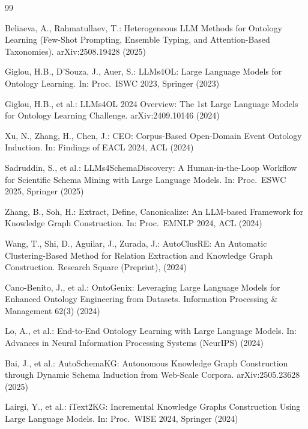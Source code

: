 \documentclass[runningheads,a4paper]{llncs}
\begin{document}

\begin{thebibliography}{99}

Beliaeva, A., Rahmatullaev, T.:
Heterogeneous LLM Methods for Ontology Learning (Few-Shot Prompting,
Ensemble Typing, and Attention-Based Taxonomies).
arXiv:2508.19428 (2025)

Giglou, H.B., D'Souza, J., Auer, S.:
LLMs4OL: Large Language Models for Ontology Learning.
In: Proc.\ ISWC 2023, Springer (2023)

Giglou, H.B., et al.:
LLMs4OL 2024 Overview: The 1st Large Language Models for Ontology
Learning Challenge.
arXiv:2409.10146 (2024)

Xu, N., Zhang, H., Chen, J.:
CEO: Corpus-Based Open-Domain Event Ontology Induction.
In: Findings of EACL 2024, ACL (2024)

Sadruddin, S., et al.:
LLMs4SchemaDiscovery: A Human-in-the-Loop Workflow for Scientific Schema
Mining with Large Language Models.
In: Proc.\ ESWC 2025, Springer (2025)

Zhang, B., Soh, H.:
Extract, Define, Canonicalize: An LLM-based Framework for Knowledge
Graph Construction.
In: Proc.\ EMNLP 2024, ACL (2024)

Wang, T., Shi, D., Aguilar, J., Zurada, J.:
AutoClusRE: An Automatic Clustering-Based Method for Relation Extraction
and Knowledge Graph Construction.
Research Square (Preprint),  (2024)

Cano-Benito, J., et al.:
OntoGenix: Leveraging Large Language Models for Enhanced Ontology
Engineering from Datasets.
Information Processing \& Management 62(3) (2024)

Lo, A., et al.:
End-to-End Ontology Learning with Large Language Models.
In: Advances in Neural Information Processing Systems (NeurIPS) (2024)

Bai, J., et al.:
AutoSchemaKG: Autonomous Knowledge Graph Construction through Dynamic
Schema Induction from Web-Scale Corpora.
arXiv:2505.23628 (2025)

Lairgi, Y., et al.:
iText2KG: Incremental Knowledge Graphs Construction Using Large Language
Models.
In: Proc.\ WISE 2024, Springer (2024)


\end{thebibliography}
\end{document}
